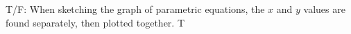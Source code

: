 {T/F: When sketching the graph of parametric equations, the $x$ and $y$ values are found separately, then plotted together.
}
{T
}
